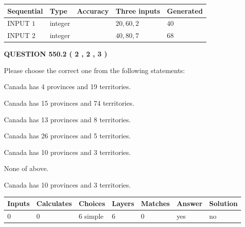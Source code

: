 \documentclass[12pt]{article}
\begin{document}
  
\noindent\begin{tabular}{|l|l|l|l|l|}
\hline
 Sequential & Type & Accuracy & Three inputs & Generated \\ 
\hline
 
 
  INPUT $  1 $ & integer &  & $
 20
 , 
 60
 , 
 2
 $ & $ 40 $ 
 \\  \hline  
 
 
  INPUT $  2 $ & integer &  & $
 40
 , 
 80
 , 
 7
 $ & $ 68 $ 
 \\  \hline  
 \end{tabular}
   
   
  
\vspace{0.2in}
  
{\textbf{\Large{QUESTION
550.2 
 ( 2 , 2 , 3 )
}}}
  
  
Please choose the correct one from the following statements:
 
 
Canada has   4 provinces and  19 territories.
 
 
Canada has  15 provinces and  74 territories.
 
 
Canada has  13 provinces and  8 territories.
 
 
Canada has  26 provinces and  5 territories.
 
 
Canada has 10  provinces and 3 territories.
 
 
 None of above.
 
 
\noindent{}
 
 
Canada has 10  provinces and 3 territories.
 
 
\noindent{}
 
 
   
   
   
   
\noindent\begin{tabular}{|l|l|l|l|l|l|l|}
 \hline
Inputs & Calculates & Choices & Layers & Matches & Answer & Solution \\ \hline
 0  & 
 0  & 
 6
  simple  
  & 
 6  & 
 0  & 
  yes & 
  no 
  \\ \hline
 \end{tabular}
   
\end{document}
